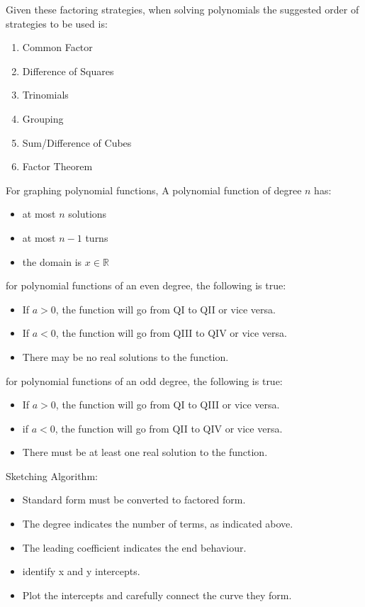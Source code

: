 \documentclass{article}
\begin{document}
Given these factoring strategies, when solving polynomials the suggested order of strategies to be used is: \begin{enumerate}
    \item Common Factor
    \item Difference of Squares
    \item Trinomials
    \item Grouping
    \item Sum/Difference of Cubes
    \item Factor Theorem
\end{enumerate}

For graphing polynomial functions, A polynomial function of degree $n$ has: 
\begin{itemize}
    \item at most $n$ solutions
    \item at most $n-1$ turns
    \item the domain is $x \in \mathbb{R}$ \\
\end{itemize}

for polynomial functions of an even degree, the following is true: \begin{itemize}
    \item If $a > 0$, the function will go from QI to QII or vice versa.
    \item If $a < 0$, the function will go from QIII to QIV or vice versa.
    \item There may be no real solutions to the function.\\
\end{itemize}
for polynomial functions of an odd degree, the following is true: \begin{itemize}
    \item If $a > 0$, the function will go from QI to QIII or vice versa.
    \item if $a < 0$, the function will go from QII to QIV or vice versa.
    \item There must be at least one real solution to the function.\\
\end{itemize}

Sketching Algorithm: \begin{itemize}
    \item Standard form must be converted to factored form.
    \item The degree indicates the number of terms, as indicated above.
    \item The leading coefficient indicates the end behaviour.
    \item identify x and y intercepts.
    \item Plot the intercepts and carefully connect the curve they form.
\end{itemize}
\end{document}
